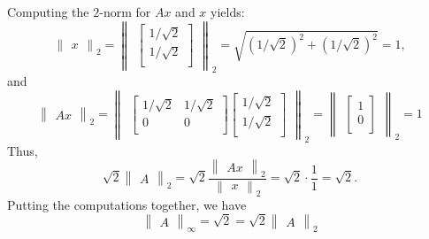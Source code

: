 \documentclass{article}
\begin{document}
Computing the $2$-norm for $Ax$ and $x$ yields:
 \[ 
    \begin{Vmatrix}
        x
    \end{Vmatrix}_2
    =
    \begin{Vmatrix}
        \begin{bmatrix}
            1/\sqrt{2}\\
            1/\sqrt{2}\\
        \end{bmatrix}
    \end{Vmatrix}_2
    = \sqrt{\left(1/\sqrt{2}\right)^2 + \left(1/\sqrt{2}\right)^2}
    = 1,
 \]
 and
 \[
    \begin{Vmatrix}
        Ax
    \end{Vmatrix}_2
    =
    \begin{Vmatrix}
        \begin{bmatrix}
            1/\sqrt{2} & 1/\sqrt{2}\\
            0 & 0\\
        \end{bmatrix}
        \begin{bmatrix}
            1/\sqrt{2}\\
            1/\sqrt{2}\\
        \end{bmatrix}
    \end{Vmatrix}_2
    =
    \begin{Vmatrix}
        \begin{bmatrix}
            1\\
            0\\
        \end{bmatrix}
    \end{Vmatrix}_2
    =
    1
 \]
 Thus, 
 \[ \sqrt{2}
    \begin{Vmatrix}
        A
    \end{Vmatrix}_2
    =
    \sqrt{2}
    \frac{
            \begin{Vmatrix}
                Ax
            \end{Vmatrix}_{2}
        }{
            \begin{Vmatrix}
                x
            \end{Vmatrix}_{2}
        } 
    =
    \sqrt{2}\cdot \frac{1}{1} = \sqrt{2}.
\]
Putting the computations together, we have 
\[
    \begin{Vmatrix}
        A
    \end{Vmatrix}_\infty
    =
    \sqrt{2}
    =
    \sqrt{2}
    \begin{Vmatrix}
        A
    \end{Vmatrix}_2
\]
\end{document}
